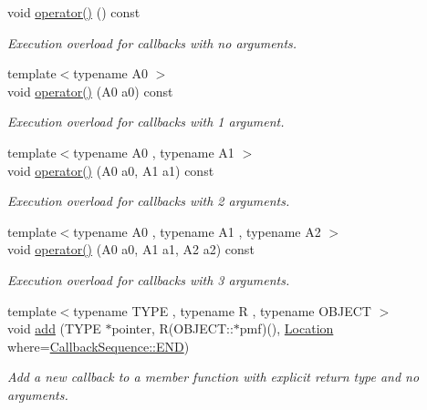\begin{DoxyCompactItemize}
void \hyperlink{struct_d_d4hep_1_1_callback_sequence_abd58114c7c8982a6110f2a0a016c83aa}{operator()} () const
\begin{DoxyCompactList}\small\item\em Execution overload for callbacks with no arguments. \end{DoxyCompactList}\item 
{\footnotesize template$<$typename A0 $>$ }\\void \hyperlink{struct_d_d4hep_1_1_callback_sequence_a8bdf601005b81230453fb957ea55444f}{operator()} (A0 a0) const
\begin{DoxyCompactList}\small\item\em Execution overload for callbacks with 1 argument. \end{DoxyCompactList}\item 
{\footnotesize template$<$typename A0 , typename A1 $>$ }\\void \hyperlink{struct_d_d4hep_1_1_callback_sequence_a0453de7821df59eb221ddab126681a26}{operator()} (A0 a0, A1 a1) const
\begin{DoxyCompactList}\small\item\em Execution overload for callbacks with 2 arguments. \end{DoxyCompactList}\item 
{\footnotesize template$<$typename A0 , typename A1 , typename A2 $>$ }\\void \hyperlink{struct_d_d4hep_1_1_callback_sequence_a19c28429931f7e1f15722c33b47c6197}{operator()} (A0 a0, A1 a1, A2 a2) const
\begin{DoxyCompactList}\small\item\em Execution overload for callbacks with 3 arguments. \end{DoxyCompactList}\item 
{\footnotesize template$<$typename T\+Y\+PE , typename R , typename O\+B\+J\+E\+CT $>$ }\\void \hyperlink{struct_d_d4hep_1_1_callback_sequence_a1042f1cdfe92acfb96e5f84b343a15d0}{add} (T\+Y\+PE $\ast$pointer, R(O\+B\+J\+E\+C\+T\+::$\ast$pmf)(), \hyperlink{struct_d_d4hep_1_1_callback_sequence_a7753490247479633aed16a2376821ef7}{Location} where=\hyperlink{struct_d_d4hep_1_1_callback_sequence_a7753490247479633aed16a2376821ef7ac39eeb1bcfc1c235ab1d0d9315c310ac}{Callback\+Sequence\+::\+E\+ND})
\begin{DoxyCompactList}\small\item\em Add a new callback to a member function with explicit return type and no arguments. \end{DoxyCompactList}\item 

\end{DoxyCompactItemize}

